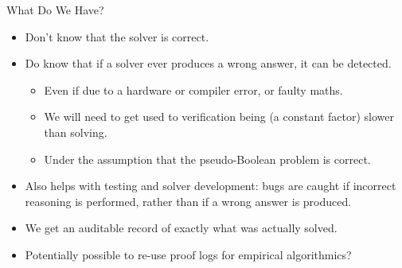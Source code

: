 \documentclass[aspectratio=169,compress,10pt]{beamer}
\begin{document}
\begin{frame}{What Do We Have?}
    \begin{itemize}
        \item Don't know that the solver is correct.
        \item Do know that if a solver ever produces a wrong answer, it can be detected.
            \begin{itemize}
                \item Even if due to a hardware or compiler error, or faulty maths.
                \item We will need to get used to verification being (a constant factor) slower than solving.\pause
                \item Under the assumption that the pseudo-Boolean problem is correct.
            \end{itemize} \pause
        \item Also helps with testing and solver development: bugs are caught if incorrect reasoning is performed,
            rather than if a wrong answer is produced. \pause
        \item We get an auditable record of exactly what was actually solved. \pause
        \item Potentially possible to re-use proof logs for empirical algorithmics?
    \end{itemize}
\end{frame}
\end{document}
